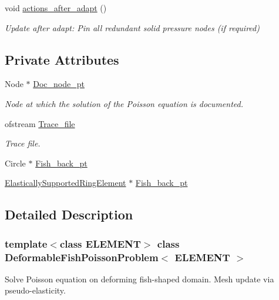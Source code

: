 \begin{DoxyCompactItemize}
void \hyperlink{classDeformableFishPoissonProblem_ada340a31a3b019116ecb7c0bb1d4c779}{actions\+\_\+after\+\_\+adapt} ()
\begin{DoxyCompactList}\small\item\em Update after adapt\+: Pin all redundant solid pressure nodes (if required) \end{DoxyCompactList}\end{DoxyCompactItemize}
\subsection*{Private Attributes}
\begin{DoxyCompactItemize}
\item 
Node $\ast$ \hyperlink{classDeformableFishPoissonProblem_acdb029d569c5ecefa5a71f2f099e7f27}{Doc\+\_\+node\+\_\+pt}
\begin{DoxyCompactList}\small\item\em Node at which the solution of the Poisson equation is documented. \end{DoxyCompactList}\item 
ofstream \hyperlink{classDeformableFishPoissonProblem_a9fc310452a96891d566f50f3a231d5d5}{Trace\+\_\+file}
\begin{DoxyCompactList}\small\item\em Trace file. \end{DoxyCompactList}\item 
Circle $\ast$ \hyperlink{classDeformableFishPoissonProblem_a88745d43dc7a9377c13190ce1bed79e7}{Fish\+\_\+back\+\_\+pt}
\item 
\hyperlink{classoomph_1_1ElasticallySupportedRingElement}{Elastically\+Supported\+Ring\+Element} $\ast$ \hyperlink{classDeformableFishPoissonProblem_aaf5e3c5b0fc0e299b56f3d10d6dcbe20}{Fish\+\_\+back\+\_\+pt}
\end{DoxyCompactItemize}


\subsection{Detailed Description}
\subsubsection*{template$<$class E\+L\+E\+M\+E\+NT$>$\newline
class Deformable\+Fish\+Poisson\+Problem$<$ E\+L\+E\+M\+E\+N\+T $>$}

Solve Poisson equation on deforming fish-\/shaped domain. Mesh update via pseudo-\/elasticity. 

